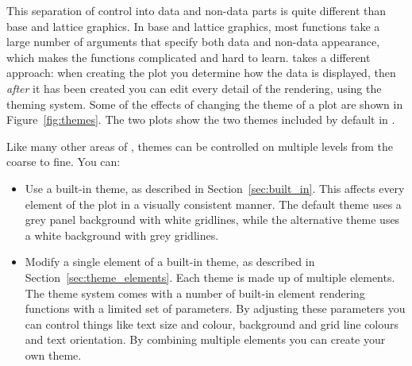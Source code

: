 This separation of control into data and non-data parts is quite different than base and lattice graphics.  In base and lattice graphics, most functions take a large number of arguments that specify both data and non-data appearance, which makes the functions complicated and hard to learn.  \ggplot takes a different approach: when creating the plot you determine how the data is displayed, then {\em after} it has been created you can edit every detail of the rendering, using the theming system.  Some of the effects of changing the theme of a plot are shown in Figure~\ref{fig:themes}.  The two plots show the two themes included by default in \ggplot.

% 


Like many other areas of \ggplot, themes can be controlled on multiple levels from the coarse to fine.  You can:

\begin{itemize}
  \item Use a built-in theme, as described in Section~\ref{sec:built_in}.  This affects every element of the plot in a visually consistent manner.  The default theme uses a grey panel background with white gridlines, while the alternative theme uses a white background with grey gridlines.

  \item Modify a single element of a built-in theme, as described in  Section~\ref{sec:theme_elements}. Each theme is made up of multiple elements. The theme system comes with a number of built-in element rendering functions with a limited set of parameters.  By adjusting these parameters you can control things like text size and colour, background and grid line colours and text orientation.  By combining multiple elements you can create your own theme.
  

\end{itemize}

